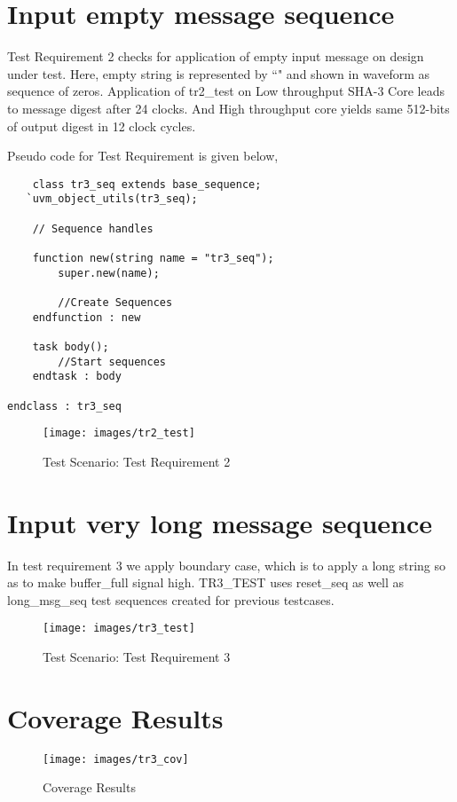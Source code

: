 \section{Input empty message sequence}

Test Requirement 2 checks for application of empty input message on design under test. Here, empty string is represented by ``" and shown in waveform as sequence of zeros. Application of tr2\_test on Low throughput SHA-3 Core leads to message digest after 24 clocks. And High throughput core yields same 512-bits of output digest in 12 clock cycles.\par
Pseudo code for Test Requirement is given below,

\begin{tcolorbox}

	\begin{verbatim}
	class tr3_seq extends base_sequence;
   `uvm_object_utils(tr3_seq);

	// Sequence handles
	
	function new(string name = "tr3_seq");
		super.new(name);
		
		//Create Sequences
	endfunction : new

	task body();
		//Start sequences
	endtask : body

endclass : tr3_seq
	\end{verbatim}
	
\end{tcolorbox}

\begin{figure}[ht]
	\centering
	\texttt{[image: images/tr2\_test]}
	\caption{Test Scenario: Test Requirement 2 \label{tr2_test}}
\end{figure}


\section{Input very long message sequence}
In test requirement 3 we apply boundary case, which is to apply a long string so as to make buffer\_full signal high. TR3\_TEST uses reset\_seq as well as long\_msg\_seq test sequences created for previous testcases.
\begin{figure}[ht]
	\centering
	\texttt{[image: images/tr3\_test]}
	\caption{Test Scenario: Test Requirement 3 \label{tr3_test}}
\end{figure}

\section{Coverage Results}
\begin{figure}[ht]
	\centering
	\texttt{[image: images/tr3\_cov]}
	\caption{Coverage Results \label{tr3cov}}
\end{figure}
